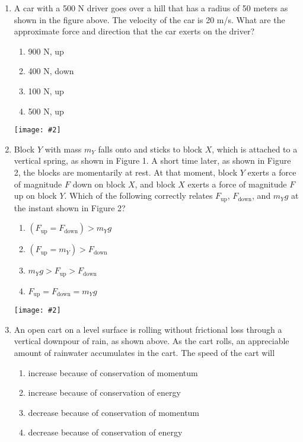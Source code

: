 \documentclass[11pt]{article}
\newcommand{\pic}[2]{\texttt{[image: \#2]}}
\begin{document}
\begin{multicols}{2}
\begin{enumerate}[leftmargin=18pt]
    \begin{center}
      \pic{.3}{IMG_20200810_093039201.jpg}
    \end{center}
  \item A car with a 500 N driver goes over a hill that has a radius of 50
    meters as shown in the figure above. The velocity of the car is 20 m/s.
    What are the approximate force and direction that the car exerts on the
    driver?
    \begin{enumerate}[noitemsep,topsep=0pt,leftmargin=18pt,label=(\Alph*)]
    \item 900 N, up
    \item 400 N, down
    \item 100 N, up
    \item 500 N, up
    \end{enumerate}
    \columnbreak
    
    \begin{center}
      \pic{.23}{falling-blocks}
    \end{center}
  \item Block $Y$ with mass $m_Y$ falls onto and sticks to block $X$, which is
    attached to a vertical spring, as shown in Figure 1. A short time later, as
    shown in Figure 2, the blocks are momentarily at rest. At that moment,
    block $Y$ exerts a force of magnitude $F$ down on block $X$, and block $X$
    exerts a force of magnitude $F$ up on block $Y$. Which of the following
    correctly relates $F_\mathrm{up}$, $F_\mathrm{down}$, and $m_Yg$ at the
    instant shown in Figure 2?
    \begin{enumerate}[noitemsep,topsep=0pt,leftmargin=18pt,label=(\Alph*)]
    \item$\left(F_\mathrm{up}=F_\mathrm{down}\right)>m_Yg$
    \item$\left(F_\mathrm{up}=m_Y\right)>F_\mathrm{down}$
    \item$m_Yg > F_\mathrm{up} > F_\mathrm{down}$
    \item$F_\mathrm{up}=F_\mathrm{down}=m_Yg$
    \end{enumerate}

    \begin{center}
      \pic{.3}{downpour}
    \end{center}
  \item An open cart on a level surface is rolling without frictional loss
    through a vertical downpour of rain, as shown above. As the cart rolls,
    an appreciable amount of rainwater accumulates in the cart. The speed of
    the cart will
    \begin{enumerate}[noitemsep,topsep=0pt,leftmargin=18pt,label=(\Alph*)]
    \item increase because of conservation of momentum
    \item increase because of conservation of energy
    \item decrease because of conservation of momentum
    \item decrease because of conservation of energy
    \end{enumerate}
    \columnbreak


\end{enumerate}
\end{multicols}
\end{document}
